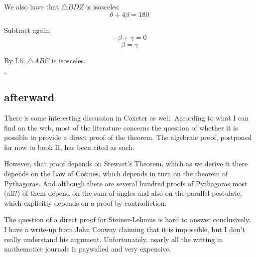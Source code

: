 \documentclass[11pt, oneside]{article}
\begin{document}
We also have that $\triangle BDZ$ is isosceles:
\[ \theta + 4 \beta = 180 \]

Subtract again:
\[ - \beta + \gamma = 0 \]
\[ \beta = \gamma \]

By I.6, $\triangle ABC$ is isosceles.

$\square$

\subsection*{afterward}

There is some interesting discussion in Coxeter as well.  According to what I can find on the web, most of the literature concerns the question of whether it is possible to provide a direct proof of the theorem.  The algebraic proof, postponed for now to book II, has been cited as such.

However, that proof depends on Stewart's Theorem, which as we derive it there depends on the Law of Cosines, which depends in turn on the theorem of Pythagoras.  And although there are several hundred proofs of Pythagoras most (all?) of them depend on the sum of angles and also on the parallel postulate, which explicitly depends on a proof by contradiction.  

The question of a direct proof for Steiner-Lehmus is hard to answer conclusively.  I have a write-up from John Conway claiming that it is impossible, but I don't really understand his argument.  Unfortunately, nearly all the writing in mathematics journals is paywalled and very expensive.
\end{document}
